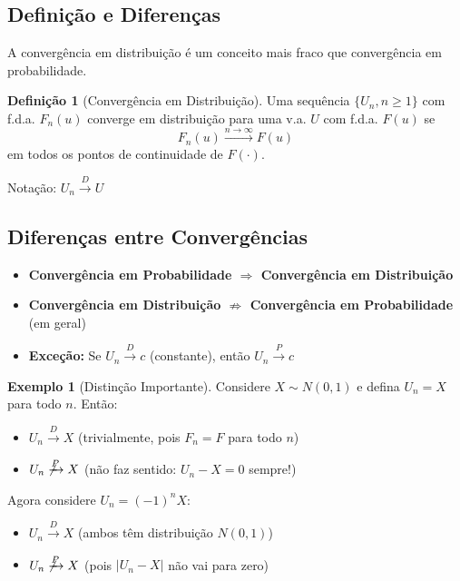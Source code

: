 \documentclass[12pt,a4paper]{article}
\theoremstyle{definition}
\newtheorem{definicao}{Definição}[section]
\newtheorem{exemplo}{Exemplo}[section]
\theoremstyle{plain}
\begin{document}
\subsection{Definição e Diferenças}

A convergência em distribuição é um conceito mais fraco que convergência em probabilidade.

\begin{definicao}[Convergência em Distribuição]
Uma sequência $\{U_n, n \geq 1\}$ com f.d.a. $F_n(u)$ converge em distribuição para uma v.a. $U$ com f.d.a. $F(u)$ se
\[
F_n(u) \xrightarrow{n \to \infty} F(u)
\]
em todos os pontos de continuidade de $F(\cdot)$.

Notação: $U_n \xrightarrow{D} U$
\end{definicao}

\subsection{Diferenças entre Convergências}

\begin{itemize}
    \item \textbf{Convergência em Probabilidade $\Rightarrow$ Convergência em Distribuição}
    
    \item \textbf{Convergência em Distribuição $\not\Rightarrow$ Convergência em Probabilidade} (em geral)
    
    \item \textbf{Exceção:} Se $U_n \xrightarrow{D} c$ (constante), então $U_n \xrightarrow{P} c$
\end{itemize}

\begin{exemplo}[Distinção Importante]
Considere $X \sim N(0,1)$ e defina $U_n = X$ para todo $n$. Então:
\begin{itemize}
    \item $U_n \xrightarrow{D} X$ (trivialmente, pois $F_n = F$ para todo $n$)
    \item $U_n \not\xrightarrow{P} X$ (não faz sentido: $U_n - X = 0$ sempre!)
\end{itemize}

Agora considere $U_n = (-1)^n X$:
\begin{itemize}
    \item $U_n \xrightarrow{D} X$ (ambos têm distribuição $N(0,1)$)
    \item $U_n \not\xrightarrow{P} X$ (pois $|U_n - X|$ não vai para zero)
\end{itemize}
\end{exemplo}
\end{document}
